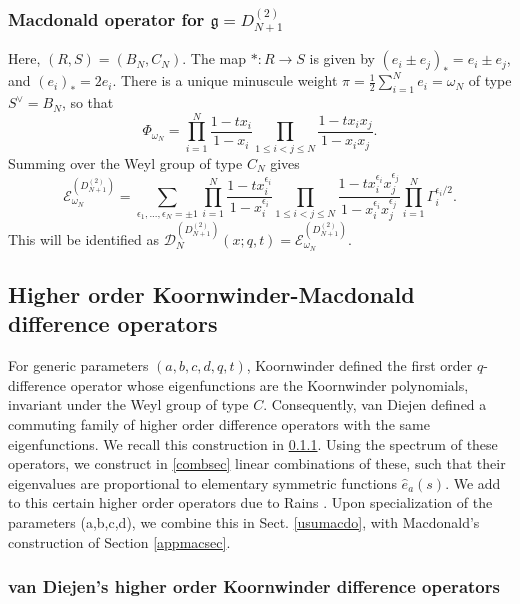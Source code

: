 \documentclass[12pt]{amsart}
\newcommand{\g}{{\mathfrak{g}}}
\newcommand{\D}{{\mathcal{D}}}
\numberwithin{equation}{section}
\begin{document}
\subsubsection{Macdonald operator for $\g=D_{N+1}^{(2)}$ }
\label{D2Nopsec} Here, $(R,S) = (B_N,C_N)$.
%
%
%
%
%
%
%
%
The map $*: R\to S$ is given by $(e_i\pm e_j)_*=e_i\pm e_j$, and $(e_i)_*=2e_i$. There is a unique minuscule weight $\pi=\frac{1}{2}\sum_{i=1}^N e_i=\omega_N$ of type $S^\vee=B_N$, so that
$$
\Phi_{\omega_N}=\prod_{i=1}^N \frac{1-t x_i}{1-x_i} \prod_{1\leq i<j\leq N}\frac{1-t x_i x_j}{1-x_ix_j}.
$$
Summing over the Weyl group of type $C_N$ gives
\begin{equation}\label{D2NN}
{\mathcal E}_{\omega_N}^{(D_{N+1}^{(2)})}= \sum_{\epsilon_1,...,\epsilon_N=\pm 1} 
\prod_{i=1}^N \frac{1-t x_i^{\epsilon_i}}{1-x_i^{\epsilon_i}}
\prod_{1\leq i<j\leq N} \frac{1-t x_i^{\epsilon_i} x_j^{\epsilon_j}}{1-x_i^{\epsilon_i} x_j^{\epsilon_j}} \prod_{i=1}^N \Gamma_i^{\epsilon_i/2}.
\end{equation}
This will be identified as $\D_N^{(D_{N+1}^{(2)})}(x;q,t)={\mathcal E}_{\omega_N}^{(D_{N+1}^{(2)})}$.

%
%
%
%
%
%
%
%
%
%
%
%
%
%
%
%
%
%
%
%
%

\subsection{Higher order Koornwinder-Macdonald difference operators}
For generic parameters $(a,b,c,d,q,t)$, Koornwinder defined the first order $q$-difference operator whose eigenfunctions are the Koornwinder polynomials, invariant under the Weyl group of type $C$.
Consequently, van Diejen \cite{vandiej} defined a commuting family of higher order difference operators with the same eigenfunctions. We recall this construction in \ref{vandisec}. 
%
Using the spectrum of these operators, we construct in  \ref{combsec} 
linear combinations of these, such that their eigenvalues are proportional to 
elementary symmetric functions ${\hat e}_a(s)$. 
We add to this certain higher order operators due to Rains \cite{Rains}.
%
Upon specialization of the parameters (a,b,c,d), we combine this in Sect. \ref{usumacdo},
with Macdonald's construction of Section \ref{appmacsec}.

\subsubsection{van Diejen's higher order Koornwinder difference operators}
\label{vandisec}
%
%
%
%
%
%
%
%
\end{document}
